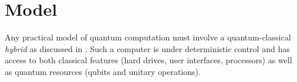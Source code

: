 \documentclass{toc}
\theoremstyle{plain}
\theoremstyle{definition}
\begin{document}

\section{Model}
\label{sec:model}

Any practical model of quantum computation
must involve a quantum-classical \textit{hybrid} as
discussed in \cite{oemer00}. Such a
computer is under deterministic control and has access to both classical
features (hard drives, user interfaces, processors)
as well as quantum resources (qubits and
unitary operations).

\end{document}

